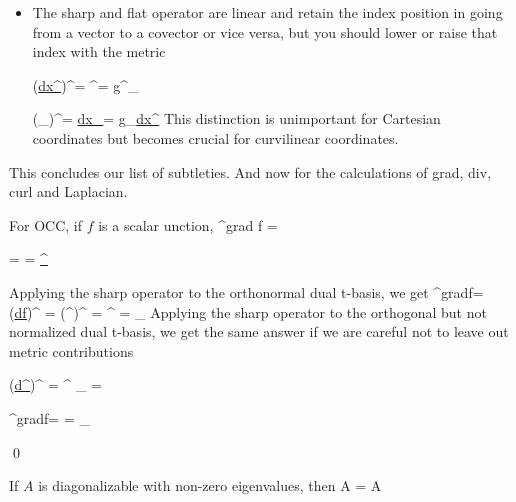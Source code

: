 \begin{itemize}
\beq
\bcen
{}\ecen
\quad\quad
{}
\label{eq-div-V-star-d-star-copy}
\eeq

\item The sharp and flat operator are linear 
and retain the index
position 
in going from a vector to a covector or vice versa, but 
you should  lower or raise that index with the metric

\beq
(\ul{dx^\mu})^\sharp=
\vecpartial^\mu=
g^{\mu\nu}\vecpartial_\nu
\eeq

\beq
(\vecpartial_\mu)^\flat=
\ul{dx_\mu}=
g_{\mu\nu}\ul{dx^\nu}
\eeq
This distinction
is unimportant
for Cartesian coordinates but 
becomes crucial
for curvilinear
coordinates.



\end{itemize}

This concludes our list of subtleties. And now for the calculations of grad, div, curl and Laplacian.

\begin{claim}
For OCC, if $f$
is a scalar unction, 
\beq
\nabla^{grad} f = 
\frac{\hat{\phi_\mu}}{\elli{\mu}}
\eeq

\end{claim}
\proof

\beq
{}=
=
\ul{\chi^\mu}
\eeq

Applying the sharp operator to the orthonormal dual t-basis,
we get
\beq
\nabla^{grad}f=
(\ul{df})^\sharp
=
(\ul{\chi}^\mu)^\sharp
=
\hat{\phi}^\mu
=
\hat{\phi}_\mu
\eeq
Applying the sharp operator 
to the orthogonal but not
normalized dual t-basis, we get the same answer if we are careful
not to leave out metric 
contributions

\beq
(\ul{d\phi^\mu})^\sharp
=
\metric^{\mu\nu}
\vecpartial_\nu
=
\vecpder{\phi^\mu}
\eeq



\beq
\nabla^{grad}f=
\vecpder{\phi^\mu}
=
\hat{\phi}_\mu
\eeq

\qed

\begin{claim}
If $A$ is diagonalizable
with non-zero eigenvalues, then
\beq
\ln \det A = \tr \ln A
\eeq
\end{claim}
\proof

